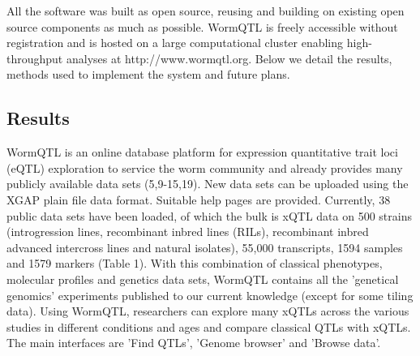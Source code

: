 All the software was built as open source, reusing and building on existing open source components 
as much as possible. WormQTL is freely accessible without registration and is hosted on a large 
computational cluster enabling high-throughput analyses at http://www.wormqtl.org. Below we detail 
the results, methods used to implement the system and future plans.

\subsection{Results}
WormQTL is an online database platform for expression quantitative trait loci (eQTL) exploration 
to service the worm community and already provides many publicly available data sets (5,9-15,19). 
New data sets can be uploaded using the XGAP plain file data format. Suitable help pages are provided. 
Currently, 38 public data sets have been loaded, of which the bulk is xQTL data on 500 strains 
(introgression lines, recombinant inbred lines (RILs), recombinant inbred advanced intercross lines 
and natural isolates), 55,000 transcripts, 1594 samples and 1579 markers (Table 1). With this 
combination of classical phenotypes, molecular profiles and genetics data sets, WormQTL contains 
all the 'genetical genomics' experiments published to our current knowledge (except for some tiling 
data). Using WormQTL, researchers can explore many xQTLs across the various studies in different 
conditions and ages and compare classical QTLs with xQTLs. The main interfaces are 'Find QTLs', 
'Genome browser' and 'Browse data'.

